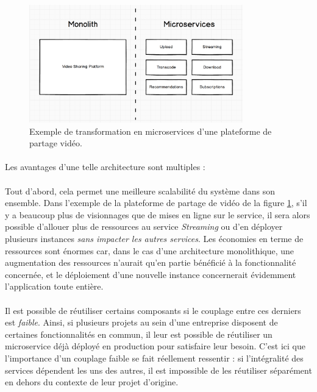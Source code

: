 \begin{figure}[h]
    \centering
    \includegraphics[width=350px]{chapters/02/images/monolith_to_microservices.png}
    \caption{\label{monolith_to_microservices} Exemple de transformation en microservices d'une plateforme de partage vidéo. \cite{Microservices1}}
\end{figure}

\paragraph{} Les avantages d'une telle architecture sont multiples :

\paragraph{} Tout d'abord, cela permet une meilleure scalabilité du système dans son ensemble. Dans l'exemple de la plateforme
de partage de vidéo de la figure \ref{monolith_to_microservices}, s'il y a beaucoup plus de visionnages que de mises en 
ligne sur le service, il sera alors possible d'allouer plus de ressources au service \emph{Streaming} ou d'en déployer
plusieurs instances \emph{sans impacter les autres services}. Les économies en terme de ressources sont énormes car, dans 
le cas d'une architecture monolithique, une augmentation des ressources n'aurait qu'en partie bénéficié à la fonctionnalité 
concernée, et le déploiement d'une nouvelle instance concernerait évidemment l'application toute entière.

\paragraph{} Il est possible de réutiliser certains composants si le couplage entre ces derniers est \emph{faible}.
Ainsi, si plusieurs projets au sein d'une entreprise disposent de certaines fonctionnalités en commun, il leur est possible 
de réutiliser un microservice déjà déployé en production pour satisfaire leur besoin. C'est ici que l'importance d'un couplage
faible se fait réellement ressentir : si l'intégralité des services dépendent les uns des autres, il est impossible de les
réutiliser séparément en dehors du contexte de leur projet d'origine.

